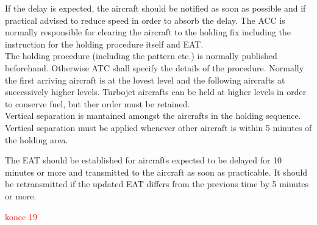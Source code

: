 If the delay is expected, the aircraft should be notified as soon as possible and if practical advised to reduce speed in order to absorb the delay. The ACC is normally responsible for clearing the aircraft to the holding fix including the instruction for the holding procedure itself and EAT.\\
The holding procedure (including the pattern etc.) is normally published beforehand. Otherwise ATC shall specify the details of the procedure. Normally the first arriving aircraft is at the lovest level and the following aircrafts at successively higher levels. Turbojet aircrafts can be held at higher levels in order to conserve fuel, but ther order must be retained.\\
Vertical separation is mantained amongst the aircrafts in the holding sequence. Vertical separation must be applied whenever other aircraft is within 5 minutes of the holding area.\cite[Chapter 6.5.5]{doc4444}

The EAT should be established for aircrafts expected to be delayed for 10 minutes or more and transmitted to the aircraft as soon as practicable. It should be retransmitted if the updated EAT differs from the previous time by 5 minutes or more.\cite[Chapter 6.5.7]{doc4444}

\textcolor{red}{konec 19}